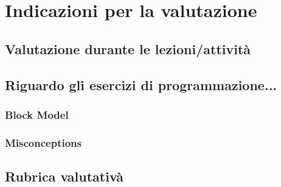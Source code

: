 \chapter{Indicazioni per la valutazione}

\section{Valutazione durante le lezioni/attività}

\section{Riguardo gli esercizi di programmazione...}

\subsection{Block Model}

\subsection{Misconceptions}

\section{Rubrica valutativà}